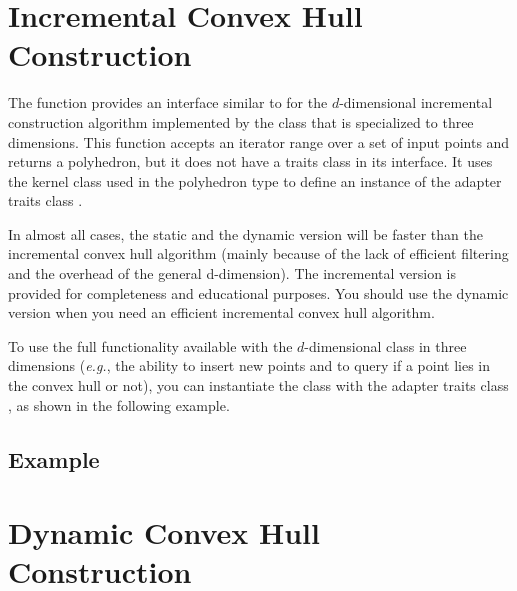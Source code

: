 

\section{Incremental  Convex Hull Construction}

The function  %
 provides an
interface similar to  for the $d$-dimensional 
incremental construction algorithm \cite{cms-frric-93}  
implemented by the class  that is specialized 
to three dimensions. This function accepts an iterator range over a set of
input points and returns a polyhedron, but it does not have a traits class
in its interface.  It uses the kernel
class  used in the polyhedron type to define an instance of the 
adapter traits class .

In almost all cases, the static and the dynamic version  will
be faster than the incremental convex hull algorithm (mainly
because of the lack of efficient filtering and the overhead
of the general d-dimension). The incremental version is provided for
completeness and educational purposes. You  should use the dynamic
version when you need an  efficient incremental  convex hull algorithm. 


To use the full functionality available with the $d$-dimensional class 
 in three dimensions (\textit{e.g.}, the ability
to insert new points and to query if a point lies in the convex hull or not), 
you can instantiate the class  with the adapter
traits class , as shown in the following
example.

\subsection{Example}


\section{Dynamic  Convex Hull Construction}

